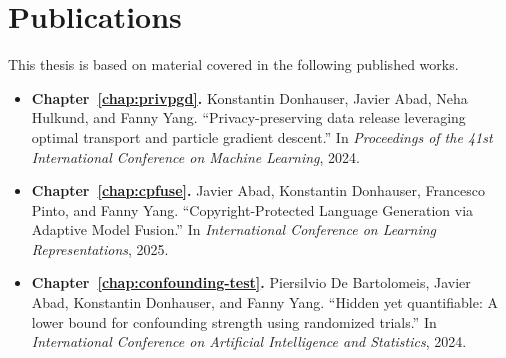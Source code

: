 \chapter*{Publications}

This thesis is based on material covered in the following published works.

\begin{itemize}
  \item \textbf{Chapter~\ref{chap:privpgd}.} Konstantin Donhauser\equalcontributionmark, Javier Abad\equalcontributionmark, Neha Hulkund, and Fanny Yang. ``Privacy-preserving data release leveraging optimal transport and particle gradient descent.'' In \emph{Proceedings of the 41st International Conference on Machine Learning}, 2024.
  \item \textbf{Chapter~\ref{chap:cpfuse}.} Javier Abad, Konstantin Donhauser, Francesco Pinto, and Fanny Yang. ``Copyright-Protected Language Generation via Adaptive Model Fusion.'' In \emph{International Conference on Learning Representations}, 2025.
  \item \textbf{Chapter~\ref{chap:confounding-test}.} Piersilvio De Bartolomeis\equalcontributionmark, Javier Abad\equalcontributionmark, Konstantin Donhauser, and Fanny Yang. ``Hidden yet quantifiable: A lower bound for confounding strength using randomized trials.'' In \emph{International Conference on Artificial Intelligence and Statistics}, 2024.
\end{itemize}

\noindent\equalcontributionnote
